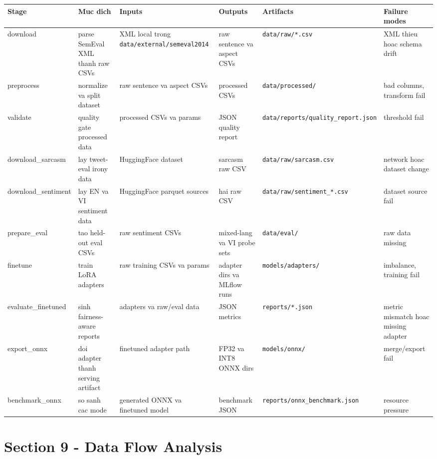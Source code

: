 \begin{longtable}{@{}p{}p{}p{}p{}p{}p{}@{}}
\toprule
\textbf{Stage} & \textbf{Muc dich} & \textbf{Inputs} & \textbf{Outputs} & \textbf{Artifacts} & \textbf{Failure modes} \\
\midrule
\endhead
download & parse SemEval XML thanh raw CSVs & XML local trong \texttt{data/external/semeval2014} & raw sentence va aspect CSVs & \texttt{data/raw/*.csv} & XML thieu hoac schema drift \\
preprocess & normalize va split dataset & raw sentence va aspect CSVs & processed CSVs & \texttt{data/processed/} & bad columns, transform fail \\
validate & quality gate processed data & processed CSVs va params & JSON quality report & \texttt{data/reports/quality\_report.json} & threshold fail \\
download\_sarcasm & lay tweet-eval irony data & HuggingFace dataset & sarcasm raw CSV & \texttt{data/raw/sarcasm.csv} & network hoac dataset change \\
download\_sentiment & lay EN va VI sentiment data & HuggingFace parquet sources & hai raw CSV & \texttt{data/raw/sentiment\_*.csv} & dataset source fail \\
prepare\_eval & tao held-out eval CSVs & raw sentiment CSVs & mixed-lang va VI probe sets & \texttt{data/eval/} & raw data missing \\
finetune & train LoRA adapters & raw training CSVs va params & adapter dirs va MLflow runs & \texttt{models/adapters/} & imbalance, training fail \\
evaluate\_finetuned & sinh fairness-aware reports & adapters va raw/eval data & JSON metrics & \texttt{reports/*.json} & metric mismatch hoac missing adapter \\
export\_onnx & doi adapter thanh serving artifact & finetuned adapter path & FP32 va INT8 ONNX dirs & \texttt{models/onnx/} & merge/export fail \\
benchmark\_onnx & so sanh cac mode & generated ONNX va finetuned model & benchmark JSON & \texttt{reports/onnx\_benchmark.json} & resource pressure \\
\bottomrule
\end{longtable}

\section{Section 9 - Data Flow Analysis}
